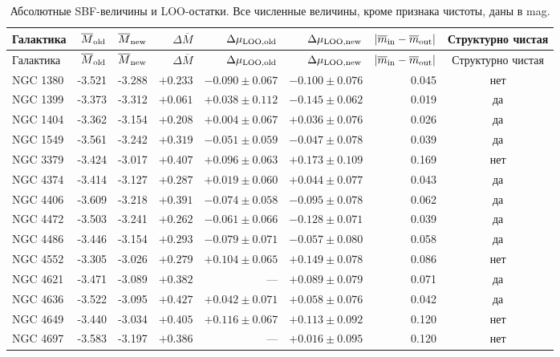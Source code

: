 \documentclass[12pt,a4paper]{article}
\begin{document}
\begin{landscape}
\scriptsize
\begin{longtable}{lrrrrrrc}
\caption{Абсолютные SBF-величины и LOO-остатки. Все численные
величины, кроме признака чистоты, даны в mag.}
\label{tab:old_new_distances}\\
\toprule
Галактика &
\(\overline M_{\rm old}\) &
\(\overline M_{\rm new}\) &
\(\Delta\overline M\) &
\(\Delta\mu_{\rm LOO,old}\) &
\(\Delta\mu_{\rm LOO,new}\) &
\(|\overline m_{\rm in}-\overline m_{\rm out}|\) &
Структурно чистая \\
\midrule
\endfirsthead
\toprule
Галактика &
\(\overline M_{\rm old}\) &
\(\overline M_{\rm new}\) &
\(\Delta\overline M\) &
\(\Delta\mu_{\rm LOO,old}\) &
\(\Delta\mu_{\rm LOO,new}\) &
\(|\overline m_{\rm in}-\overline m_{\rm out}|\) &
Структурно чистая \\
\midrule
\endhead
\bottomrule
\endfoot
NGC 1380 & -3.521 & -3.288 & \(+0.233\) & \(-0.090\pm0.067\) & \(-0.100\pm0.076\) & 0.045 & нет \\
NGC 1399 & -3.373 & -3.312 & \(+0.061\) & \(+0.038\pm0.112\) & \(-0.145\pm0.062\) & 0.019 & да \\
NGC 1404 & -3.362 & -3.154 & \(+0.208\) & \(+0.004\pm0.067\) & \(+0.036\pm0.076\) & 0.026 & да \\
NGC 1549 & -3.561 & -3.242 & \(+0.319\) & \(-0.051\pm0.059\) & \(-0.047\pm0.078\) & 0.039 & да \\
NGC 3379 & -3.424 & -3.017 & \(+0.407\) & \(+0.096\pm0.063\) & \(+0.173\pm0.109\) & 0.169 & нет \\
NGC 4374 & -3.414 & -3.127 & \(+0.287\) & \(+0.019\pm0.060\) & \(+0.044\pm0.077\) & 0.043 & да \\
NGC 4406 & -3.609 & -3.218 & \(+0.391\) & \(-0.074\pm0.058\) & \(-0.095\pm0.078\) & 0.062 & да \\
NGC 4472 & -3.503 & -3.241 & \(+0.262\) & \(-0.061\pm0.066\) & \(-0.128\pm0.071\) & 0.039 & да \\
NGC 4486 & -3.446 & -3.154 & \(+0.293\) & \(-0.079\pm0.071\) & \(-0.057\pm0.080\) & 0.058 & да \\
NGC 4552 & -3.305 & -3.026 & \(+0.279\) & \(+0.104\pm0.065\) & \(+0.149\pm0.078\) & 0.086 & нет \\
NGC 4621 & -3.471 & -3.089 & \(+0.382\) & --- & \(+0.089\pm0.079\) & 0.071 & да \\
NGC 4636 & -3.522 & -3.095 & \(+0.427\) & \(+0.042\pm0.071\) & \(+0.058\pm0.076\) & 0.042 & да \\
NGC 4649 & -3.440 & -3.034 & \(+0.405\) & \(+0.116\pm0.067\) & \(+0.113\pm0.092\) & 0.120 & нет \\
NGC 4697 & -3.583 & -3.197 & \(+0.386\) & --- & \(+0.016\pm0.095\) & 0.120 & нет \\
\end{longtable}
\end{landscape}
\end{document}
